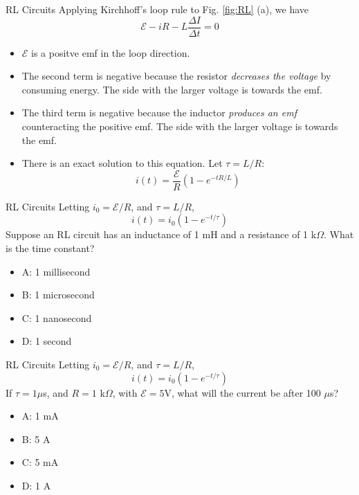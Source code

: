 \documentclass{beamer}
\begin{document}
\begin{frame}{RL Circuits}
\small
Applying Kirchhoff's loop rule to Fig. \ref{fig:RL} (a), we have
\begin{equation}
\mathcal{E} - iR - L \frac{\Delta I}{\Delta t} = 0
\end{equation}
\footnotesize
\begin{itemize}
\item $\mathcal{E}$ is a positve emf in the loop direction.
\item The second term is negative because the resistor \textit{decreases the voltage} by consuming energy.  The side with the larger voltage is towards the emf.
\item The third term is negative because the inductor \textit{produces an emf} counteracting the positive emf.  The side with the larger voltage is towards the emf.
\item There is an exact solution to this equation.  Let $\tau = L/R$:
\begin{equation}
i(t) = \frac{\mathcal{E}}{R}\left(1 - e^{-tR/L}\right)
\end{equation}
\end{itemize}
\end{frame}

\begin{frame}{RL Circuits}
Letting $i_0 = \mathcal{E}/R$, and $\tau = L/R$,
\begin{equation}
i(t) = i_0\left(1 - e^{-t/\tau}\right)
\end{equation}
Suppose an RL circuit has an inductance of 1 mH and a resistance of 1 k$\Omega$.  What is the time constant?
\begin{itemize}
\item A: 1 millisecond
\item B: 1 microsecond
\item C: 1 nanosecond
\item D: 1 second
\end{itemize}
\end{frame}

\begin{frame}{RL Circuits}
Letting $i_0 = \mathcal{E}/R$, and $\tau = L/R$,
\begin{equation}
i(t) = i_0\left(1 - e^{-t/\tau}\right)
\end{equation}
If $\tau = 1 \mu$s, and $R = 1$ k$\Omega$, with $\mathcal{E} = 5$V, what will the current be after 100 $\mu$s?
\begin{itemize}
\item A: 1 mA
\item B: 5 A
\item C: 5 mA
\item D: 1 A
\end{itemize}
\end{frame}
\end{document}
